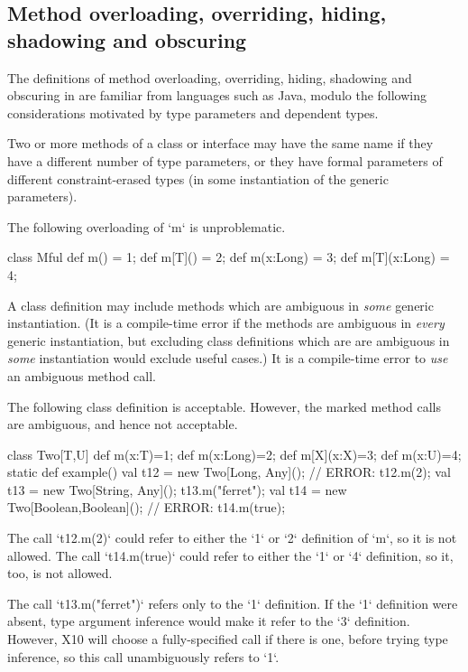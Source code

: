\subsection{Method overloading, overriding, hiding, shadowing and obscuring}
\label{MethodOverload}



The definitions of method overloading, overriding, hiding, shadowing and
obscuring in \Xten{} are familiar from languages such as Java, modulo the
following considerations motivated by type parameters and dependent types.



Two or more methods of a class or interface may have the same
name if they have a different number of type parameters, or
they have formal parameters of different constraint-erased types (in some instantiation of the
generic parameters). 



\begin{ex}
The following overloading of \xcd`m` is unproblematic.
\begin{xten}
class Mful{
   def m() = 1;
   def m[T]() = 2;
   def m(x:Long) = 3;
   def m[T](x:Long) = 4;
}
\end{xten}
%
\end{ex}


A class definition may include methods which are ambiguous in {\em some}
generic instantiation. (It is a compile-time error if the methods are
ambiguous in {\em every} generic instantiation, but excluding class
definitions which are are ambiguous in {\em some} instantiation would exclude
useful cases.)  It is a compile-time error to {\em use} an ambiguous method
call. 

\begin{ex}
The following class definition is acceptable.  However, the marked method
calls are ambiguous, and hence not acceptable.
\begin{xten}
class Two[T,U]{
  def m(x:T)=1;
  def m(x:Long)=2;
  def m[X](x:X)=3;
  def m(x:U)=4;
  static def example() {
    val t12 = new Two[Long, Any]();
    // ERROR: t12.m(2);
    val t13  = new Two[String, Any]();
    t13.m("ferret");
    val t14 = new Two[Boolean,Boolean]();
    // ERROR: t14.m(true);
  }
}
\end{xten}
\noindent
The call \xcd`t12.m(2)` could refer to either the \xcd`1` or \xcd`2`
definition of \xcd`m`, so it is not allowed.   
The call \xcd`t14.m(true)` could refer to either the \xcd`1` or \xcd`4`
definition, so it, too, is not allowed.

The call \xcd`t13.m("ferret")` refers only to the \xcd`1` definition.  If
the \xcd`1` definition were absent, type argument inference would make it
refer to the \xcd`3` definition.  However, X10 will choose a fully-specified
call if there is one, before trying type inference, so this call unambiguously
refers to \xcd`1`.
\end{ex}


